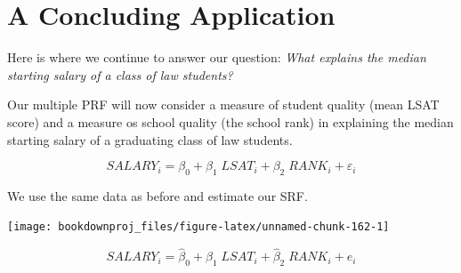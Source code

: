 \documentclass[
]{book}
\newenvironment{Shaded}{\begin{snugshade}}{\end{snugshade}}
\newcommand{\AttributeTok}[1]{\textcolor[rgb]{0.13,0.29,0.53}{#1}}
\newcommand{\DecValTok}[1]{\textcolor[rgb]{0.00,0.00,0.81}{#1}}
\newcommand{\FunctionTok}[1]{\textcolor[rgb]{0.13,0.29,0.53}{\textbf{#1}}}
\newcommand{\NormalTok}[1]{#1}
\newcommand{\OtherTok}[1]{\textcolor[rgb]{0.56,0.35,0.01}{#1}}
\newcommand{\SpecialCharTok}[1]{\textcolor[rgb]{0.81,0.36,0.00}{\textbf{#1}}}
\newcommand{\StringTok}[1]{\textcolor[rgb]{0.31,0.60,0.02}{#1}}
\begin{document}
\section{A Concluding Application}\label{a-concluding-application-1}

Here is where we continue to answer our question: \emph{What explains the median starting salary of a class of law students?}

Our multiple PRF will now consider a measure of student quality (mean LSAT score) and a measure os school quality (the school rank) in explaining the median starting salary of a graduating class of law students.

\[SALARY_i = \beta_0 + \beta_1 \; LSAT_i + \beta_2 \; RANK_i + \varepsilon_i\]

We use the same data as before and estimate our SRF.

\begin{Shaded}
\end{Shaded}

\begin{center}\texttt{[image: bookdownproj\_files/figure-latex/unnamed-chunk-162-1]} \end{center}

\[SALARY_i = \hat\beta_0 + \hat\beta_1 \; LSAT_i + \hat\beta_2 \; RANK_i + e_i\]
\end{document}
